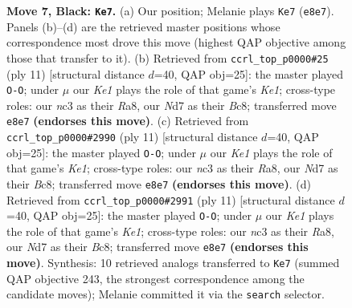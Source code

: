 \documentclass[11pt]{article}
\begin{document}
\begin{figure}[p]
\caption{\textbf{Move 7, Black: \texttt{Ke7}.} (a) Our position; Melanie plays \texttt{Ke7} (\texttt{e8e7}). Panels (b)--(d) are the retrieved master positions whose correspondence most drove this move (highest QAP objective among those that transfer to it). (b) Retrieved from \texttt{ccrl\_top\_p0000\#25} (ply 11) [structural distance $d$=40, QAP obj=25]: the master played \texttt{O-O}; under $\mu$ our \emph{Ke1} plays the role of that game's \emph{Ke1}; cross-type roles: our \emph{n}c3 as their \emph{R}a8, our \emph{N}d7 as their \emph{B}c8; transferred move \texttt{e8e7} \textbf{(endorses this move)}. (c) Retrieved from \texttt{ccrl\_top\_p0000\#2990} (ply 11) [structural distance $d$=40, QAP obj=25]: the master played \texttt{O-O}; under $\mu$ our \emph{Ke1} plays the role of that game's \emph{Ke1}; cross-type roles: our \emph{n}c3 as their \emph{R}a8, our \emph{N}d7 as their \emph{B}c8; transferred move \texttt{e8e7} \textbf{(endorses this move)}. (d) Retrieved from \texttt{ccrl\_top\_p0000\#2991} (ply 11) [structural distance $d$=40, QAP obj=25]: the master played \texttt{O-O}; under $\mu$ our \emph{Ke1} plays the role of that game's \emph{Ke1}; cross-type roles: our \emph{n}c3 as their \emph{R}a8, our \emph{N}d7 as their \emph{B}c8; transferred move \texttt{e8e7} \textbf{(endorses this move)}. Synthesis: 10 retrieved analogs transferred to \texttt{Ke7} (summed QAP objective 243, the strongest correspondence among the candidate moves); Melanie committed it via the \texttt{search} selector.}
\label{fig:thought-m13}
\end{figure}

\clearpage
\end{document}
